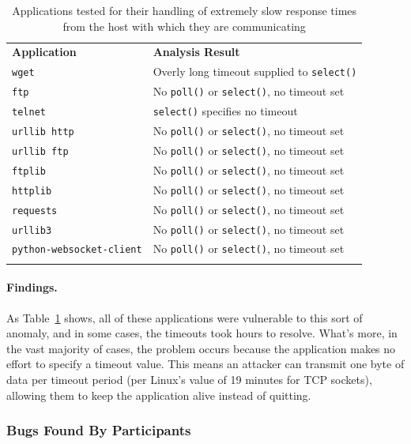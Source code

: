 \begin{table}[t]
  \scriptsize{}
  \begin{tabular}{l | l}
    \toprule{}
    {\bf Application}              & {\bf Analysis Result}\\
    {\tt wget}                     & Overly long timeout supplied to {\tt select()} \\
    {\tt ftp}                      & No {\tt poll()} or {\tt select()}, no timeout set \\
    {\tt telnet}                   & {\tt select()} specifies no timeout \\
    {\tt urllib http}              & No {\tt poll()} or {\tt select()}, no timeout set \\
    {\tt urllib ftp}               & No {\tt poll()} or {\tt select()}, no timeout set \\
    {\tt ftplib}                   & No {\tt poll()} or {\tt select()}, no timeout set \\
    {\tt httplib}                  & No {\tt poll()} or {\tt select()}, no timeout set \\
    {\tt requests}                 & No {\tt poll()} or {\tt select()}, no timeout set \\
    {\tt urllib3}                  & No {\tt poll()} or {\tt select()}, no timeout set \\
    {\tt python-websocket-client}  & No {\tt poll()} or {\tt select()}, no timeout set \\
    \bottomrule{}
  \end{tabular}
  \caption{Applications tested for their handling of extremely slow response
    times from the host with which they are communicating }
  \label{table:slowloris}
\end{table}


\paragraph{Findings.}
As Table~\ref{table:slowloris} shows, all of these
applications were vulnerable to this sort of anomaly,
and in some cases,
the timeouts took hours to resolve.
What's more, in the vast majority of
cases, the problem occurs because the application makes no effort to
specify a timeout value.  This means an attacker can transmit one byte of
data per timeout period (per Linux's value of 19 minutes for TCP sockets),
allowing them to keep the application alive instead of quitting.

\subsubsection{Bugs Found By Participants}

